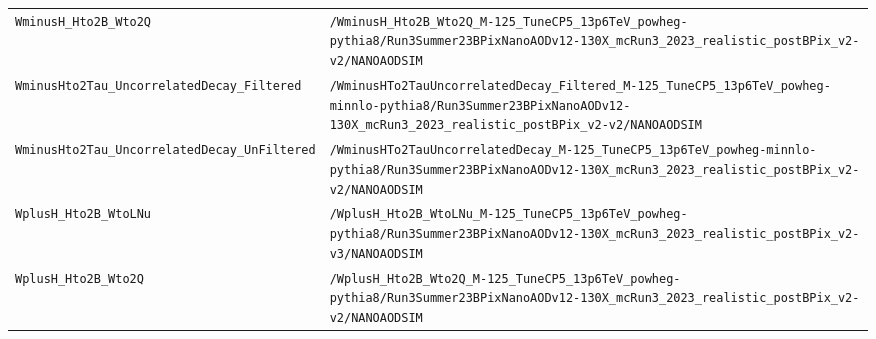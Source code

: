 \begin{longtable}{@{}>{\RaggedRight\arraybackslash}p{} >{\RaggedRight\arraybackslash}p{}@{}}
\addlinespace[2pt]
\texttt{WminusH\_\allowbreak{}Hto2B\_\allowbreak{}Wto2Q} & \texttt{/\allowbreak{}WminusH\_\allowbreak{}Hto2B\_\allowbreak{}Wto2Q\_\allowbreak{}M-\allowbreak{}125\_\allowbreak{}TuneCP5\_\allowbreak{}13p6TeV\_\allowbreak{}powheg-\allowbreak{}pythia8/\allowbreak{}Run3Summer23BPixNanoAODv12-\allowbreak{}130X\_\allowbreak{}mcRun3\_\allowbreak{}2023\_\allowbreak{}realistic\_\allowbreak{}postBPix\_\allowbreak{}v2-\allowbreak{}v2/\allowbreak{}NANOAODSIM} \\
\addlinespace[2pt]
\texttt{WminusHto2Tau\_\allowbreak{}UncorrelatedDecay\_\allowbreak{}Filtered} & \texttt{/\allowbreak{}WminusHTo2TauUncorrelatedDecay\_\allowbreak{}Filtered\_\allowbreak{}M-\allowbreak{}125\_\allowbreak{}TuneCP5\_\allowbreak{}13p6TeV\_\allowbreak{}powheg-\allowbreak{}minnlo-\allowbreak{}pythia8/\allowbreak{}Run3Summer23BPixNanoAODv12-\allowbreak{}130X\_\allowbreak{}mcRun3\_\allowbreak{}2023\_\allowbreak{}realistic\_\allowbreak{}postBPix\_\allowbreak{}v2-\allowbreak{}v2/\allowbreak{}NANOAODSIM} \\
\addlinespace[2pt]
\texttt{WminusHto2Tau\_\allowbreak{}UncorrelatedDecay\_\allowbreak{}UnFiltered} & \texttt{/\allowbreak{}WminusHTo2TauUncorrelatedDecay\_\allowbreak{}M-\allowbreak{}125\_\allowbreak{}TuneCP5\_\allowbreak{}13p6TeV\_\allowbreak{}powheg-\allowbreak{}minnlo-\allowbreak{}pythia8/\allowbreak{}Run3Summer23BPixNanoAODv12-\allowbreak{}130X\_\allowbreak{}mcRun3\_\allowbreak{}2023\_\allowbreak{}realistic\_\allowbreak{}postBPix\_\allowbreak{}v2-\allowbreak{}v2/\allowbreak{}NANOAODSIM} \\
\addlinespace[2pt]
\texttt{WplusH\_\allowbreak{}Hto2B\_\allowbreak{}WtoLNu} & \texttt{/\allowbreak{}WplusH\_\allowbreak{}Hto2B\_\allowbreak{}WtoLNu\_\allowbreak{}M-\allowbreak{}125\_\allowbreak{}TuneCP5\_\allowbreak{}13p6TeV\_\allowbreak{}powheg-\allowbreak{}pythia8/\allowbreak{}Run3Summer23BPixNanoAODv12-\allowbreak{}130X\_\allowbreak{}mcRun3\_\allowbreak{}2023\_\allowbreak{}realistic\_\allowbreak{}postBPix\_\allowbreak{}v2-\allowbreak{}v3/\allowbreak{}NANOAODSIM} \\
\addlinespace[2pt]
\texttt{WplusH\_\allowbreak{}Hto2B\_\allowbreak{}Wto2Q} & \texttt{/\allowbreak{}WplusH\_\allowbreak{}Hto2B\_\allowbreak{}Wto2Q\_\allowbreak{}M-\allowbreak{}125\_\allowbreak{}TuneCP5\_\allowbreak{}13p6TeV\_\allowbreak{}powheg-\allowbreak{}pythia8/\allowbreak{}Run3Summer23BPixNanoAODv12-\allowbreak{}130X\_\allowbreak{}mcRun3\_\allowbreak{}2023\_\allowbreak{}realistic\_\allowbreak{}postBPix\_\allowbreak{}v2-\allowbreak{}v2/\allowbreak{}NANOAODSIM} \\

\end{longtable}
